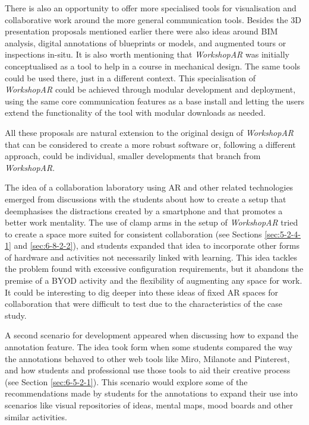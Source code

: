 There is also an opportunity to offer more specialised tools for visualisation and collaborative work around the more general communication tools. Besides the 3D presentation proposals mentioned earlier
there were also ideas around BIM analysis, digital annotations of blueprints or models, and augmented tours or inspections in-situ. It is also worth mentioning that \emph{WorkshopAR} was initially
conceptualised as a tool to help in a course in mechanical design. The same tools could be used there, just in a different context. This specialisation of \emph{WorkshopAR} could be achieved through modular
development and deployment, using the same core communication features as a base install and letting the users extend the functionality of the tool with modular downloads as needed.

All these proposals are natural extension to the original design of \emph{WorkshopAR} that can be considered to create a more robust software or, following a different approach, could be individual,
smaller developments that branch from \emph{WorkshopAR}.

The idea of a collaboration laboratory using \ac{AR} and other related technologies emerged from discussions with the students about how to create a setup that deemphasises the distractions
created by a smartphone and that promotes a better work mentality. The use of clamp arms in the setup of \emph{WorkshopAR} tried to create a space more suited for consistent collaboration
(see Sections \ref{sec:5-2-4-1} and \ref{sec:6-8-2-2}), and students expanded that idea to incorporate other forms of hardware and activities not necessarily linked with learning. This idea
tackles the problem found with excessive configuration requirements, but it abandons the premise of a \acf{BYOD} activity and the flexibility of augmenting any space for work. It could be
interesting to dig deeper into these ideas of fixed \ac{AR} spaces for collaboration that were difficult to test due to the characteristics of the case study.

A second scenario for development appeared when discussing how to expand the annotation feature. The idea took form when some students compared the way the annotations behaved to other web
tools like Miro, Milanote and Pinterest, and how students and professional use those tools to aid their creative process  (see Section \ref{sec:6-5-2-1}). This scenario would explore some
of the recommendations made by students for the annotations to expand their use into scenarios like visual repositories of ideas, mental maps, mood boards and other similar activities.


